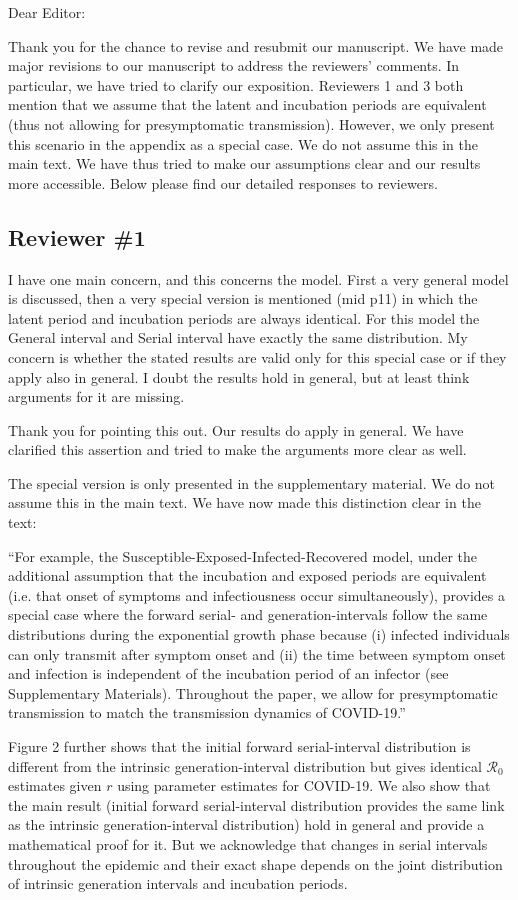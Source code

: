 \documentclass[12pt]{article}
\newcommand{\Ro}{\ensuremath{{\mathcal R}_{0}}\xspace}
\newcommand{\rev}{\subsection*}
\newcommand{\revtext}{\textsf}
\begin{document}
\noindent Dear Editor:

Thank you for the chance to revise and resubmit our manuscript. 
We have made major revisions to our manuscript to address the reviewers' comments.
In particular, we have tried to clarify our exposition.
Reviewers 1 and 3 both mention that we assume that the latent and incubation periods are equivalent (thus not allowing for presymptomatic transmission). 
However, we only present this scenario in the appendix as a special case.
We do not assume this in the main text.
We have thus tried to make our assumptions clear and our results more accessible.
Below please find our detailed responses to reviewers.

\rev{Reviewer \#1}

\revtext{I have one main concern, and this concerns the model. First a very general model is discussed, then a very special version is mentioned (mid p11) in which the latent period and incubation periods are always identical. For this model the General interval and Serial interval have exactly the same distribution. My concern is whether the stated results are valid only for this special case or if they apply also in general. I doubt the results hold in general, but at least think arguments for it are missing.}

Thank you for pointing this out. Our results do apply in general. We have clarified this assertion and tried to make the arguments more clear as well.

The special version is only presented in the supplementary material. We do not assume this in the main text. We have now made this distinction clear in the text:

``For example, the Susceptible-Exposed-Infected-Recovered model, under the additional assumption that the incubation and exposed periods are equivalent (i.e. that onset of symptoms and infectiousness occur simultaneously), provides a special case where the forward serial- and generation-intervals follow the same distributions during the exponential growth phase because (i) infected individuals can only transmit after symptom onset and (ii) the time between symptom onset and infection is independent of the incubation period of an infector (see Supplementary Materials).
Throughout the paper, we allow for presymptomatic transmission to match the transmission dynamics of COVID-19.''

Figure 2 further shows that the initial forward serial-interval distribution is different from the intrinsic generation-interval distribution but gives identical \Ro estimates given $r$ using parameter estimates for COVID-19. 
We also show that the main result (initial forward serial-interval distribution provides the same link as the intrinsic generation-interval distribution) hold in general and provide a mathematical proof for it. But we acknowledge that changes in serial intervals throughout the epidemic and their exact shape depends on the joint distribution of intrinsic generation intervals and incubation periods.
\end{document}
